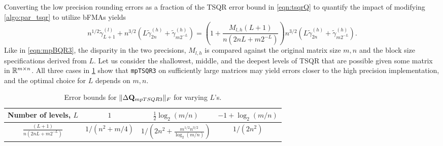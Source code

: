 Converting the low precision rounding errors as a fraction of the TSQR error bound in \cref{eqn:tsqrQ} to quantify the impact of modifying \cref{algo:par_tsqr} to utilize bFMAs yields
\begin{equation}
	n^{1/2}\tilde{\gamma}_{L+1}^{(l)}+n^{3/2}\left(L\tilde{\gamma}_{2n}^{(h)}+\tilde{\gamma}_{m2^{-L}}^{(h)}\right) = \left(1+ \frac{M_{l,h}(L+1)}{n(2nL+m2^{-L})}\right)n^{3/2}\left(L\tilde{\gamma}_{2n}^{(h)}+\tilde{\gamma}_{m2^{-L}}^{(h)}\right).\label{eqn:mpTSQR3}
\end{equation}
Like in \cref{eqn:mpBQR3}, the disparity in the two precisions, $M_{l,h}$ is compared against the original matrix size $m,n$ and the block size specifications derived from $L$.
Let us consider the shallowest, middle, and the deepest levels of TSQR that are possible given some matrix in $\mathbb{R}^{m\times n}$.
All three cases in \cref{table:mpTSQR3} show that {\tt mpTSQR3} on sufficiently large matrices may yield errors closer to the high precision implementation, and the optimal choice for $L$ depends on $m,n$. 
\begin{table}[H]
	\center
	\begin{tabular}{||c|c|c|c||} 
		\hline
		 Number of levels, $L$& $1$ & $\frac{1}{2}\log_2(m/n)$ & $-1+\log_2(m/n)$ \\ \hline
		$\frac{(L+1)}{n(2nL+m2^{-L})}$&  $1/(n^2+m/4)$ &$1/\left(2n^2+\frac{m^{1/2}n^{3/2}}{\log_2(m/n)}\right)$ & $1/(2n^2)$\\ \hline
	\end{tabular}
	\caption{Error bounds for $\|\Delta \mathbf{Q}_{mpTSQR3}\|_F$ for varying $L$'s.} 
	\label{table:mpTSQR3}
\end{table} 
\vspace{-1cm}
